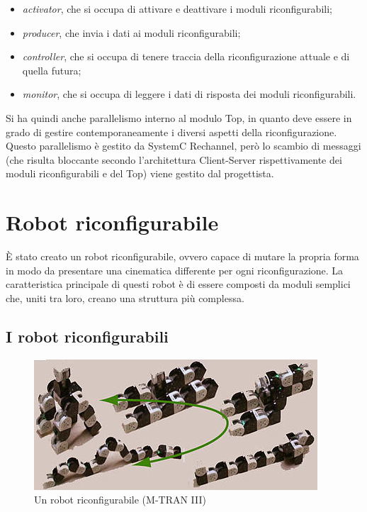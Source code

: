 \documentclass[a4paper,titlepage]{book}
\begin{document}
\begin{itemize}
  \item \textit{activator}, che si occupa di attivare e deattivare i moduli riconfigurabili;
  \item \textit{producer}, che invia i dati ai moduli riconfigurabili;
  \item \textit{controller}, che si occupa di tenere traccia della riconfigurazione attuale e di quella futura;
  \item \textit{monitor}, che si occupa di leggere i dati di risposta dei moduli riconfigurabili.
\end{itemize}

Si ha quindi anche parallelismo interno al modulo Top, in quanto deve essere in grado di gestire contemporaneamente i diversi aspetti della riconfigurazione. Questo parallelismo è gestito da SystemC Rechannel, però lo scambio di messaggi (che risulta bloccante secondo l'architettura Client-Server rispettivamente dei moduli riconfigurabili e del Top) viene gestito dal progettista.

\section{Robot riconfigurabile}

È stato creato un robot riconfigurabile, ovvero capace di mutare la propria forma in modo da presentare una cinematica differente per ogni riconfigurazione. La caratteristica principale di questi robot è di essere composti da moduli semplici che, uniti tra loro, creano una struttura più complessa.


\subsection{I robot riconfigurabili}

\begin{figure}[htbp]
\centering
\includegraphics[scale=0.5]{robot_riconfigurabile1.jpg}
\caption{Un robot riconfigurabile (M-TRAN III)}\label{fig:9}
\end{figure}
\end{document}
